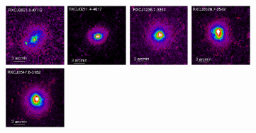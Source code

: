 \documentclass[oldversion]{aa}
\begin{document}
\begin{figure}[]
\includegraphics[scale=1.,angle=0,keepaspectratio,width=0.195\textwidth]{0944fa2f.ps}
\hfill
\includegraphics[scale=1.,angle=0,keepaspectratio,width=0.195\textwidth]{0944fa2g.ps}
\hfill
\includegraphics[scale=1.,angle=0,keepaspectratio,width=0.195\textwidth]{0944fa2h.ps}
\hfill
\includegraphics[scale=1.,angle=0,keepaspectratio,width=0.195\textwidth]{0944fa2i.ps}
\hfill
\includegraphics[scale=1.,angle=0,keepaspectratio,width=0.195\textwidth]{0944fa2j.ps}



\end{figure}
\end{document}
